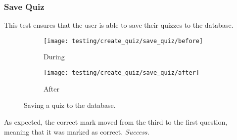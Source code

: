 \subsubsection{Save Quiz} %
\label{ssub:add_category}
This test ensures that the user is able to save their quizzes to the database.
\begin{figure}[!htbp]
\centering
\begin{subfigure}{0.5\textwidth}
  \centering
  \texttt{[image: testing/create\_quiz/save\_quiz/before]}
  \caption{During}
  \label{fig:sub1}
\end{subfigure}%
\begin{subfigure}{0.5\textwidth}
  \centering
  \texttt{[image: testing/create\_quiz/save\_quiz/after]}
  \caption{After}
  \label{fig:sub2}
\end{subfigure}
\caption{Saving a quiz to the database.}
\label{fig:test}
\end{figure}
As expected, the correct mark moved from the third to the first question, meaning that it was marked as correct. \textit{Success.}
